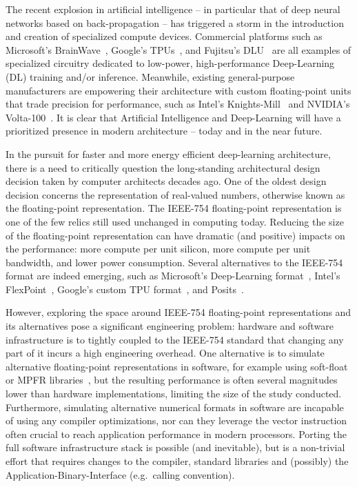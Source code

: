 \documentclass[techrep,english]{ipsj} %
\begin{document}
The recent explosion in artificial intelligence – in particular that of deep neural networks based on back-propagation – has triggered a storm in the introduction and creation of specialized compute devices.
Commercial platforms such as Microsoft’s BrainWave~\cite{msbrainwave}, Google’s TPUs~\cite{googletpu}, and Fujitsu’s DLU~\cite{fujitsudlu} are all examples of specialized circuitry dedicated to low-power, high-performance Deep-Learning (DL) training and/or inference.
Meanwhile, existing general-purpose manufacturers are empowering their architecture with custom floating-point units that trade precision for performance, such as Intel’s Knights-Mill~\cite{knm} and NVIDIA’s Volta-100~\cite{volta100}.
It is clear that Artificial Intelligence and Deep-Learning will have a prioritized presence in modern architecture -- today and in the near future.

In the pursuit for faster and more energy efficient deep-learning architecture, there is a need to critically question the long-standing architectural design decision taken by computer architects decades ago.
One of the oldest design decision concerns the representation of real-valued numbers, otherwise known as the floating-point representation.
The IEEE-754 floating-point representation is one of the few relics still used unchanged in computing today.
Reducing the size of the floating-point representation can have dramatic (and positive) impacts on the performance: more compute per unit silicon, more compute per unit bandwidth, and lower power consumption.
Several alternatives to the IEEE-754 format are indeed emerging, such as Microsoft’s Deep-Learning format~\cite{msbrainwave}, Intel’s FlexPoint~\cite{intelflexpoint}, Google’s custom TPU format~\cite{tpuformat}, and Posits~\cite{posits}.

However, exploring the space around IEEE-754 floating-point representations and its alternatives pose a significant engineering problem: hardware and software infrastructure is to tightly coupled to the IEEE-754 standard that changing any part of it incurs a high engineering overhead.
One alternative is to simulate alternative floating-point representations in software, for example using soft-float or MPFR libraries~\cite{softfloat}, but the resulting performance is often several magnitudes lower than hardware implementations, limiting the size of the study conducted.
Furthermore, simulating alternative numerical formats in software are incapable of using any compiler optimizations, nor can they leverage the vector instruction often crucial to reach application performance in modern processors.
Porting the full software infrastructure stack is possible (and inevitable), but is a non-trivial effort that requires changes to the compiler, standard libraries and (possibly) the Application-Binary-Interface (e.g.\ calling convention).
\end{document}
